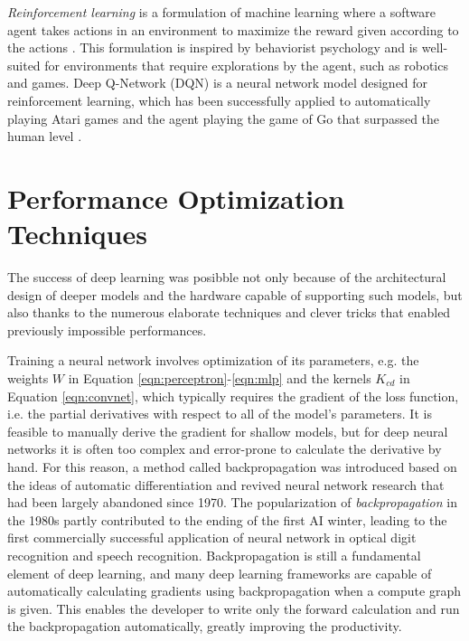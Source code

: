 \emph{Reinforcement learning} is a formulation of machine learning where a software agent takes actions in an environment to maximize the reward given according to the actions \cite{sutton2018reinforcement}.
This formulation is inspired by behaviorist psychology and is well-suited for environments that require explorations by the agent, such as robotics and games.
Deep Q-Network (DQN) \cite{mnih2015dqn} is a neural network model designed for reinforcement learning, which has been successfully applied to automatically playing Atari games \cite{mnih2013atari} and the agent playing the game of Go that surpassed the human level \cite{silver2016alphago}.


\section{Performance Optimization Techniques}

The success of deep learning was posibble not only because of the architectural design of deeper models and the hardware capable of supporting such models, but also thanks to the numerous elaborate techniques and clever tricks that enabled previously impossible performances.

Training a neural network involves optimization of its parameters, e.g. the weights $W$ in Equation \ref{eqn:perceptron}-\ref{eqn:mlp} and the kernels $K_{cd}$ in Equation \ref{eqn:convnet}, which typically requires the gradient of the loss function, i.e. the partial derivatives with respect to all of the model's parameters.
It is feasible to manually derive the gradient for shallow models, but for deep neural networks it is often too complex and error-prone to calculate the derivative by hand.
For this reason, a method called backpropagation \cite{werbos1982backpropagation, rumelhart1986backpropagation} was introduced based on the ideas of automatic differentiation \cite{linnainmaa1970ad} and revived neural network research that had been largely abandoned since 1970.
The popularization of \emph{backpropagation} in the 1980s partly contributed to the ending of the first AI winter, leading to the first commercially successful application of neural network in optical digit recognition and speech recognition.
Backpropagation is still a fundamental element of deep learning, and many deep learning frameworks are capable of automatically calculating gradients using backpropagation when a compute graph is given.
This enables the developer to write only the forward calculation and run the backpropagation automatically, greatly improving the productivity.


